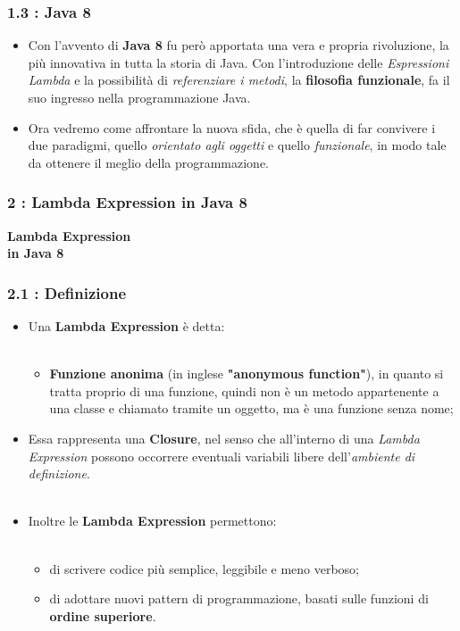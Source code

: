 \documentclass{beamer}
\begin{document}

\begin{frame}
	\frametitle{\textbf{1.3 : Java 8}}
	\begin{itemize}
		\item
			Con l'avvento di \textbf{Java 8} fu però apportata una vera e propria rivoluzione, la più innovativa in tutta la storia di Java. Con l'introduzione delle \textit{Espressioni Lambda} e la possibilità di \textit{referenziare i metodi}, la \textbf{filosofia funzionale}, fa il suo ingresso nella programmazione Java.
		\item
			Ora vedremo come affrontare la nuova sfida, che è quella di far convivere i due paradigmi, quello \textit{orientato agli oggetti} e quello \textit{funzionale}, in modo tale da ottenere il meglio della programmazione.				
	\end{itemize}
\end{frame}


\begin{frame}
	\frametitle{\textbf{2 : Lambda Expression in Java 8}}
	\begin{center}
		\textbf{\Huge Lambda Expression\\ in Java 8}
	\end{center}
\end{frame}


\begin{frame}
	\frametitle{\textbf{2.1 : Definizione}}
	\begin{itemize}
			\item
				Una \textbf{Lambda Expression} è detta:\\\
				\begin{itemize}
					\item
						\textbf{Funzione anonima} (in inglese \textbf{"anonymous function"}), in quanto si tratta proprio di una funzione, quindi non è un metodo appartenente a una classe e chiamato tramite un oggetto, ma è una funzione senza nome;
				
				\end{itemize}
				\item 
			Essa rappresenta una \textbf{Closure}, nel senso che all'interno di una \textit{Lambda Expression} possono occorrere eventuali variabili libere dell'\textit{ambiente di definizione}.\\\
			\item
				Inoltre le \textbf{Lambda Expression} permettono:\\\
				\begin{itemize}
					\item
						di scrivere codice più semplice, leggibile e meno verboso;
					\item
						di adottare nuovi pattern di programmazione, basati sulle funzioni di \textbf{ordine superiore}.
				\end{itemize}				
	\end{itemize}
\end{frame}
\end{document}
